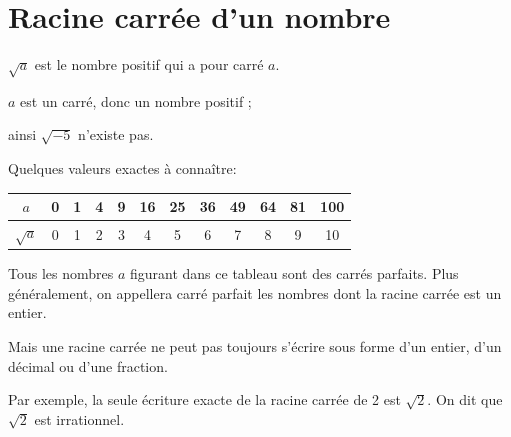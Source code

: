 

\section{Racine carrée d'un nombre}

\begin{defi}{}{}
$\sqrt{a}$ est le nombre positif qui a pour carré $a$.
\end{defi}

\medskip
 $a$ est un carré, donc un nombre positif ; 

 ainsi $\sqrt{-5}$ n'existe pas.
\medskip

 Quelques valeurs exactes à connaître:

\vspace{-15mm}
\begin{flushright}
\renewcommand{\arraystretch}{1.5}
\begin{tabular}{|c|c|c|c|c|c|c|c|c|c|c|c|}\hline
$a$&0&1&4&9&16&25&36&49&64&81&100\\\hline
$\sqrt{a}$&0&1&2&3&4&5&6&7&8&9&10\\\hline
\end{tabular}
\end{flushright}

\vspace{-6mm}
\begin{rem}{}{}
Tous les nombres $a$ figurant dans ce tableau sont des carrés parfaits. Plus généralement, on appellera carré parfait les nombres dont la racine carrée est un entier.

\medskip
 Mais une racine carrée ne peut pas toujours s'écrire sous forme d'un entier, d'un décimal ou d'une fraction.

 Par exemple, la seule écriture exacte de la racine carrée de 2 est $\sqrt{2}$. On dit que $\sqrt{2}$ est irrationnel.
\end{rem}

